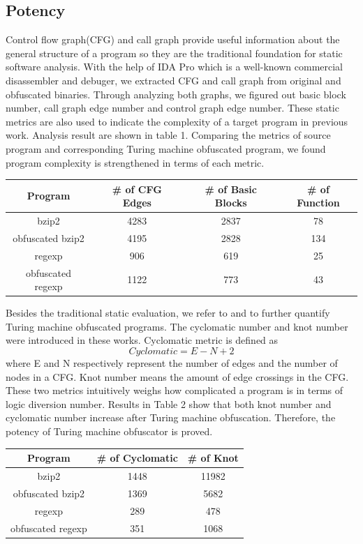 \documentclass[lnicst]{svmultln}
\begin{document}
\subsection{Potency}
%
Control flow graph(CFG) and call  graph provide useful information about the general structure of a program so they are the traditional foundation for static software analysis. With the help of IDA Pro\cite{ida} which is a well-known commercial disassembler and debuger, we extracted CFG and call graph from original and obfuscated binaries. Through analyzing both graphs, we figured out basic block number, call graph edge number and control graph edge number. These static metrics are also used to indicate the complexity of a target program in previous work\cite{Chen}. Analysis result are shown in table 1. Comparing the metrics of source program and corresponding Turing machine obfuscated program, we found program complexity is strengthened in terms of each metric.


\begin{center}
 
 \begin{tabular}{|c | c | c | c|}
 \hline 
 Program & \# of CFG Edges & \# of Basic Blocks & \# of Function \\
 \hline
bzip2 & 4283 & 2837 & 78 \\ 
 \hline
obfuscated bzip2 & 4195 & 2828 & 134 \\
 \hline
regexp & 906 & 619 & 25 \\ 
 \hline
obfuscated regexp & 1122 & 773 & 43 \\
 \hline
\end{tabular}
\end{center}

Besides the traditional static evaluation, we refer to \cite{McCabe} and \cite{Woodward} to further quantify Turing machine obfuscated programs. The cyclomatic number and knot number were introduced in these works. Cyclomatic metric is defined as \[ Cyclomatic = E - N + 2 \] where E and N respectively represent the number of edges and the number of nodes in a CFG. Knot number means the amount of edge crossings in the CFG. These two metrics intuitively weighs how complicated a program is in terms of logic diversion number. Results in Table 2 show that both knot number and cyclomatic number increase after Turing machine obfuscation. Therefore, the potency of Turing machine obfuscator is proved.

\begin{center}
 \begin{tabular}{|c | c | c |} 
 \hline 
 Program & \# of Cyclomatic & \# of Knot \\
 \hline
bzip2 & 1448 & 11982  \\ 
 \hline
obfuscated bzip2 & 1369 & 5682  \\
 \hline
regexp & 289 & 478 \\ 
 \hline
obfuscated regexp & 351 & 1068 \\
 \hline
\end{tabular}
\end{center}
\end{document}
